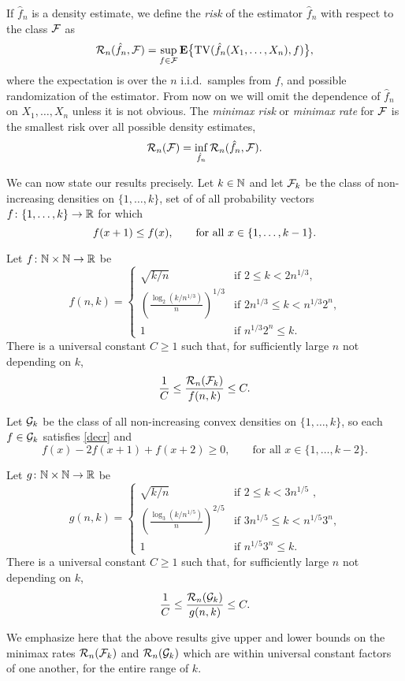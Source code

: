 If $\hat{f}_n$ is a density estimate, we define the \emph{risk} of the
estimator $\hat{f}_n$ with respect to the class $\mathcal{F}$ as
\[
  \mathcal{R}_n(\hat{f}_n, \mathcal{F}) = \sup_{f \in \mathcal{F}} \operatorname{\mathbf{E}}\bigl\{\operatorname{TV}(\hat{f}_n(X_1, \dots, X_n), f)\bigr\} ,
\]
where the expectation is over the $n$ i.i.d.\ samples from $f$, and
possible randomization of the estimator. From now on we will omit the
dependence of $\hat{f}_n$ on $X_1, \dots, X_n$ unless it is not
obvious. The \emph{minimax risk} or \emph{minimax rate} for $\mathcal{F}$ is
the smallest risk over all possible density estimates,
\[
  \mathcal{R}_n(\mathcal{F}) = \inf_{\hat{f}_n} \mathcal{R}_n(\hat{f}_n, \mathcal{F}) .
\]

We can now state our results precisely. Let $k \in \mathbb{N}$ and let $\mathcal{F}_k$
be the class of non-increasing densities on $\{1, \dots, k\}$, \ie set
of of all probability vectors $f \colon \{1, \dots, k\} \to \mathbb{R}$ for
which
\begin{equation}
  f(x + 1) \le f(x) , \qquad \text{for all $x \in \{1, \dots, k - 1\}$.} \eqlabel{decr}
\end{equation}
\begin{thm}
  Let $f \colon \mathbb{N} \times \mathbb{N} \to \mathbb{R}$ be
  \[
    f(n, k) = \left\{
      \begin{array}{ll}
        \sqrt{k/n} & \mbox{if $2 \le k < 2 n^{1/3}$,} \\
        {\left( \frac{\log_2 (k/n^{1/3})}{n} \right)}^{1/3} & \mbox{if $2 n^{1/3} \le k < n^{1/3} 2^n$,} \\
        1 & \mbox{if $n^{1/3} 2^n \le k$.}
      \end{array} \right.
  \]
  There is a universal constant $C \ge 1$ such that, for sufficiently
  large $n$ not depending on $k$,
  \[
    \frac{1}{C} \le \frac{\mathcal{R}_n(\mathcal{F}_k)}{f(n, k)} \le C .
  \]
\end{thm}
Let $\mathcal{G}_k$ be the class of all non-increasing convex densities on
$\{1, \dots, k\}$, so each $f \in \mathcal{G}_k$ satisfies \eqref{decr} and
\[
  f(x) - 2 f(x + 1) + f(x + 2) \ge 0 , \qquad \text{for all $x \in \{1, \dots, k - 2\}$.} 
\]
\begin{thm}
  Let $g \colon \mathbb{N} \times \mathbb{N} \to \mathbb{R}$ be
  \[
    g(n, k) = \left\{
      \begin{array}{ll}
        \sqrt{k/n} & \mbox{if $2 \le k < 3 n^{1/5}$ ,} \\
        {\left(\frac{\log_3 (k/n^{1/5})}{n}\right)}^{2/5} & \mbox{if $3 n^{1/5} \le k < n^{1/5} 3^n$,} \\
        1 & \mbox{if $n^{1/5} 3^n \le k$.}
      \end{array} \right.
  \]
  There is a universal constant $C \ge 1$ such that, for sufficiently
  large $n$ not depending on $k$,
  \[
    \frac{1}{C} \le \frac{\mathcal{R}_n(\mathcal{G}_k)}{g(n, k)} \le C .
  \]
\end{thm}
We emphasize here that the above results give upper and lower bounds
on the minimax rates $\mathcal{R}_n(\mathcal{F}_k)$ and $\mathcal{R}_n(\mathcal{G}_k)$ which are
within universal constant factors of one another, for the entire range
of $k$.

